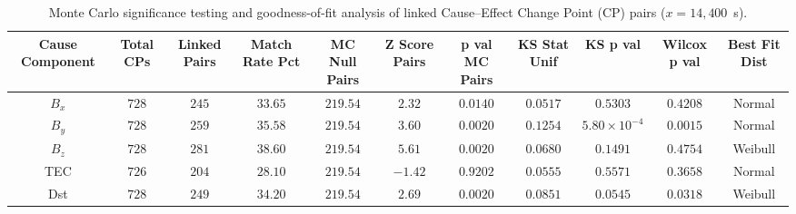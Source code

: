\vspace{-3pt}
\begin{table}[H]
\caption{Monte Carlo significance testing and goodness-of-fit analysis of linked Cause--Effect Change Point (CP) pairs ($x = 14,400$~s).\label{tab:Hypothesis_Testing_and_MC_Null}}
\begin{tabularx}{\textwidth}{CCCCCCCCCCC}
\toprule
\textbf{Cause Component} & \textbf{Total CPs} & \textbf{Linked Pairs} & \textbf{Match Rate Pct} & \textbf{MC Null Pairs} & \textbf{Z Score Pairs} & \textbf{p val MC Pairs} & \textbf{KS Stat Unif} & \textbf{KS p val} & \textbf{Wilcox p val} & \textbf{Best Fit Dist} \\
\midrule
$B_x$ & $728$ & $245$ & $33.65$ & $219.54$ & $2.32$ & $0.0140$ & $0.0517$ & $0.5303$ & $0.4208$ & Normal \\
$B_y$ & $728$ & $259$ & $35.58$ & $219.54$ & $3.60$ & $0.0020$ & $0.1254$ & $5.80 \times 10^{-4}$ & $0.0015$ & Normal \\
$B_z$ & $728$ & $281$ & $38.60$ & $219.54$ & $5.61$ & $0.0020$ & $0.0680$ & $0.1491$ & $0.4754$ & Weibull \\
TEC & $726$ & $204$ & $28.10$ & $219.54$ & $-1.42$ & $0.9202$ & $0.0555$ & $0.5571$ & $0.3658$ & Normal \\
Dst & $728$ & $249$ & $34.20$ & $219.54$ & $2.69$ & $0.0020$ & $0.0851$ & $0.0545$ & $0.0318$ & Weibull \\
\bottomrule
\end{tabularx}
\end{table}
\vspace{-3pt}
